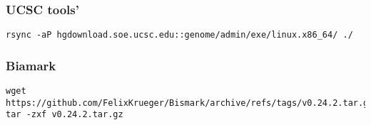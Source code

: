 \documentclass[
]{book}
\begin{document}
\subsubsection{UCSC tools'}\label{ucsc-tools}

\begin{verbatim}
rsync -aP hgdownload.soe.ucsc.edu::genome/admin/exe/linux.x86_64/ ./
\end{verbatim}

\subsubsection{Biamark}\label{biamark}

\begin{verbatim}
wget https://github.com/FelixKrueger/Bismark/archive/refs/tags/v0.24.2.tar.gz
tar -zxf v0.24.2.tar.gz
\end{verbatim}

  
\end{document}
